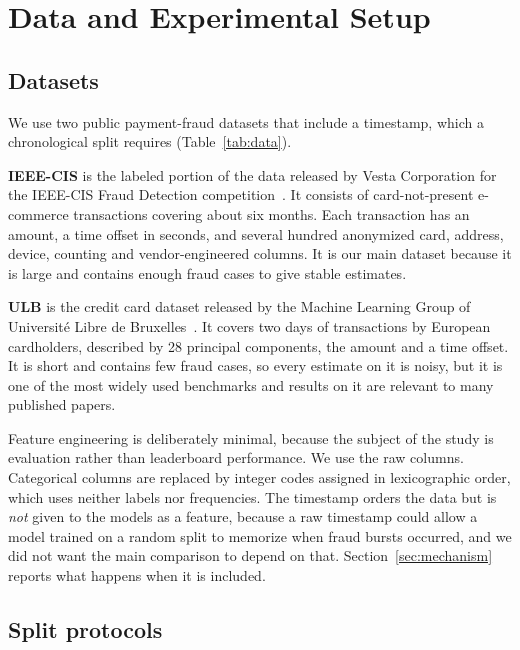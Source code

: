 \section{Data and Experimental Setup}
\label{sec:setup}

\subsection{Datasets}

We use two public payment-fraud datasets that include a timestamp, which a chronological split requires (Table~\ref{tab:data}).

\textbf{IEEE-CIS} is the labeled portion of the data released by Vesta Corporation for the IEEE-CIS Fraud Detection competition~\cite{ieeecis2019fraud}. It consists of card-not-present e-commerce transactions covering about six months. Each transaction has an amount, a time offset in seconds, and several hundred anonymized card, address, device, counting and vendor-engineered columns. It is our main dataset because it is large and contains enough fraud cases to give stable estimates.

\textbf{ULB} is the credit card dataset released by the Machine Learning Group of Universit\'e Libre de Bruxelles~\cite{dalpozzolo2015calibrating}. It covers two days of transactions by European cardholders, described by 28 principal components, the amount and a time offset. It is short and contains few fraud cases, so every estimate on it is noisy, but it is one of the most widely used benchmarks and results on it are relevant to many published papers.



Feature engineering is deliberately minimal, because the subject of the study is evaluation rather than leaderboard performance. We use the raw columns. Categorical columns are replaced by integer codes assigned in lexicographic order, which uses neither labels nor frequencies. The timestamp orders the data but is \emph{not} given to the models as a feature, because a raw timestamp could allow a model trained on a random split to memorize when fraud bursts occurred, and we did not want the main comparison to depend on that. Section~\ref{sec:mechanism} reports what happens when it is included.

\subsection{Split protocols}

